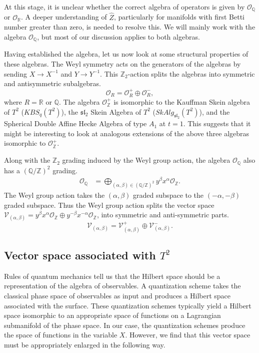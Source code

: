 \documentclass{article}
\newcommand{\Z}{{\mathbb Z}}
\newcommand{\R}{{\mathbb R}}
\newcommand{\Q}{{\mathbb Q}}
\def\be{\begin{equation}}
\def\ee{\end{equation}}
\numberwithin{corollary}{theorem}
\numberwithin{corollary}{proposition}
\begin{document}
At this stage, it is unclear whether the correct algebra of operators is given by $\mathcal{O}_{\Q}$ or $\mathcal{O}_{\R}$. A deeper understanding of $\hat{Z}$, particularly for manifolds with first Betti number greater than zero, is needed to resolve this. We will mainly work with the algebra $\mathcal{O}_{\Q}$, but most of our discussion applies to both algebras. 

Having established the algebra, let us now look at some structural properties of these algebras. The Weyl symmetry acts on the generators of the algebras by sending $X \rightarrow X^{-1}$ and $Y \rightarrow Y^{-1}$. This $\Z_{2}$-action splits the algebras into symmetric and antisymmetric subalgebras.
\be 
\mathcal{O}_{R} = \mathcal{O}_{R}^{+} \oplus \mathcal{O}_{R}^{-},
\ee 
where $R= \R $ or $\Q$. The algebra $\mathcal{O}_{\Z}^{+}$ is isomorphic to the Kauffman Skein algebra of $T^{2}$ ($KBS_{q}(T^{2})$), the $\mathfrak{sl}_{2}$ Skein Algebra of $T^{2}$ ($SkAlg_{\mathfrak{sl}_{2}}(T^{2})$), and the Spherical Double Affine Hecke Algebra of type $A_{1}$ at $t=1$. This suggests that it might be interesting to look at analogous extensions of the above three algebras isomorphic to $\mathcal{O}_{\Z}^{+}$. 

Along with the $\Z_{2}$ grading induced by the Weyl group action, the algebra $\mathcal{O}_{\Q}$ also has a $(\Q/\Z)^{2}$ grading.
\begin{align}
 \mathcal{O}_{\Q} &= \bigoplus_{(\alpha,\beta)\in (\Q/\Z)^{2} }  y^{\beta} x^{\alpha} \mathcal{O}_{\Z}.
\end{align}
The Weyl group action takes the $(\alpha,\beta)$ graded subspace to the $(-\alpha,-\beta)$ graded subspace. Thus the Weyl group action splits the vector space $\mathcal{V}_{(\alpha,\beta)} = y^{\beta} x^{\alpha}  \mathcal{O}_{\Z} \oplus y^{-\beta} x^{-\alpha}  \mathcal{O}_{\Z} $, into symmetric and anti-symmetric parts.
\be \label{vecab}
\mathcal{V}_{(\alpha,\beta)} = \mathcal{V}^{+}_{(\alpha,\beta)} \oplus \mathcal{V}^{-}_{(\alpha,\beta)}.
\ee 





\subsection{Vector space associated with \texorpdfstring{$T^{2}$}{T2}}
Rules of quantum mechanics tell us that the Hilbert space should be a representation of the algebra of observables. A quantization scheme takes the classical phase space of observables as input and produces a Hilbert space associated with the surface. These quantization schemes typically yield a Hilbert space isomorphic to an appropriate space of functions on a Lagrangian submanifold of the phase space. In our case, the quantization schemes produce the space of functions in the variable $X$. However, we find that this vector space must be appropriately enlarged in the following way. 
\end{document}
